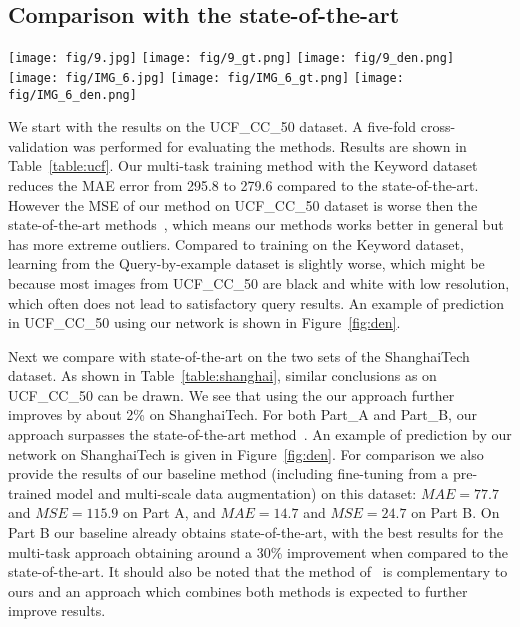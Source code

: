 \documentclass[10pt,twocolumn,letterpaper]{article}
\begin{document}
\subsection{Comparison with the state-of-the-art}

\begin{figure*}[tpb]
\centering

\texttt{[image: fig/9.jpg]} 
 \texttt{[image: fig/9\_gt.png]}
 \texttt{[image: fig/9\_den.png]}\\
 \texttt{[image: fig/IMG\_6.jpg]}
 \texttt{[image: fig/IMG\_6\_gt.png]}
 \texttt{[image: fig/IMG\_6\_den.png]}

\caption{Examples of predicted density maps for the UCF\_CC\_50 (Top row, true count: 3406 prediction: 3052) and ShanghaiTech datasets (Bottom row, true count: 361 prediction: 365).  Left column: crowd image. Middle column: ground truth. Right column: prediction.}
  \label{fig:den}
\end{figure*}

We start with the results on the UCF\_CC\_50 dataset.  A five-fold
cross-validation was performed for evaluating the methods. Results are
shown in Table~\ref{table:ucf}. Our multi-task training method with
the Keyword dataset reduces the MAE error from 295.8 to 279.6 compared to
the state-of-the-art. However the MSE of our method on UCF\_CC\_50
dataset is worse then the state-of-the-art
methods~\cite{walach2016learning,sindagi2017generating}, which means
our methods works better in general but has more extreme
outliers. Compared to training on the Keyword dataset, learning from
the Query-by-example dataset is slightly worse, which might be because
most images from UCF\_CC\_50 are black and white with low
resolution, which often does not lead to satisfactory query
results. An example of prediction in UCF\_CC\_50 using our
network is shown in Figure~\ref{fig:den}.

Next we compare with state-of-the-art on the two sets of the
ShanghaiTech dataset.  As shown in Table~\ref{table:shanghai}, similar 
conclusions as on UCF\_CC\_50 can be drawn. We see that using the
our approach further improves by about 2\% on ShanghaiTech. For both Part\_A and Part\_B, our approach surpasses the
state-of-the-art method~\cite{sindagi2017generating}.  An example of
prediction by our network on ShanghaiTech is given in
Figure~\ref{fig:den}. For comparison we also provide the results of
our baseline method (including fine-tuning from a pre-trained model
and multi-scale data augmentation) on this dataset: $MAE=77.7$ and $MSE=115.9$ on
Part A, and $MAE=14.7$ and $MSE=24.7$ on Part B. 
On Part B our baseline already obtains state-of-the-art, with the best
results for the multi-task approach obtaining around a 30\%
improvement when compared to the state-of-the-art. It should also be
noted that the method of~\cite{sindagi2017generating} is complementary
to ours and an approach which combines both methods is expected to
further improve results.
\end{document}
